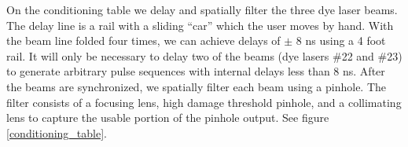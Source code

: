 On the conditioning table we delay and spatially filter the three dye laser beams. The delay line is a rail with a sliding ``car'' which the user moves by hand. With the beam line folded four times, we can achieve delays of $\pm$ 8 ns using a 4 foot rail. It will only be necessary to delay two of the beams (dye lasers \#22 and \#23) to generate arbitrary pulse sequences with internal delays less than 8 ns. After the beams are synchronized, we spatially filter each beam using a pinhole. The filter consists of a focusing lens, high damage threshold pinhole, and a collimating lens to capture the usable portion of the pinhole output. See figure \ref{conditioning_table}.

